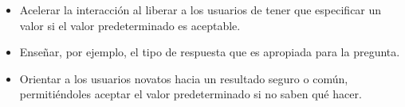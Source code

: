 		\begin{itemize}
			\item Acelerar la interacción al liberar a los usuarios de tener que especificar un valor si el valor predeterminado es aceptable.
			
			\item Enseñar, por ejemplo, el tipo de respuesta que es apropiada para la pregunta.
			
			\item Orientar a los usuarios novatos hacia un resultado seguro o común, permitiéndoles aceptar el valor predeterminado si no saben qué hacer.
		\end{itemize}
	